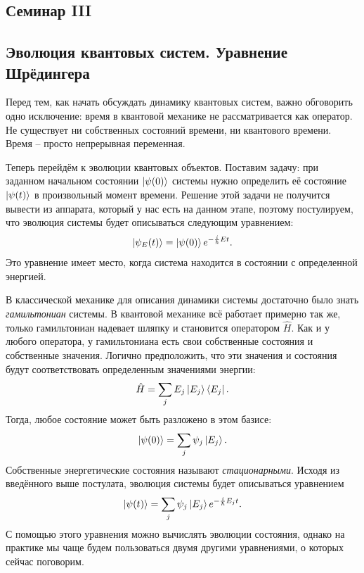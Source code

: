 \begin{center}
    \section{Семинар III}
\end{center}
\subsection{Эволюция квантовых систем. Уравнение Шрёдингера}
\hspace{1em} Перед тем, как начать обсуждать динамику квантовых систем, важно обговорить одно исключение: время в квантовой механике не рассматривается как оператор. Не существует ни собственных состояний времени, ни квантового времени. Время – просто непрерывная переменная.

Теперь перейдём к эволюции квантовых объектов. Поставим задачу: при заданном начальном состоянии $\ket{\psi(0)}$ системы нужно определить её состояние $\ket{\psi(t)}$ в произвольный момент времени. Решение этой задачи не получится вывести из аппарата, который у нас есть на данном этапе, поэтому постулируем, что эволюция системы будет описываться следующим уравнением:
\[
\ket{\psi_E(t)} = \ket{\psi(0)} e^{-\frac{i}{\hbar} E t}.
\]
Это уравнение имеет место, когда система находится в состоянии с определенной энергией.

В классической механике для описания динамики системы достаточно было знать \textit{гамильтониан} системы. В квантовой механике всё работает примерно так же, только гамильтониан надевает шляпку и становится оператором $\hat{H}$. Как и у любого оператора, у гамильтониана есть свои собственные состояния и собственные значения. Логично предположить, что эти значения и состояния будут соответствовать определенным значениями энергии:
\[
\hat{H} = \sum_j E_j \ket{E_j} \bra{E_j}.
\]
Тогда, любое состояние может быть разложено в этом базисе:
\[
\ket{\psi(0)} = \sum_j \psi_j \ket{E_j}.
\]
Собственные энергетические состояния называют \textit{стационарными}. Исходя из введённого выше постулата, эволюция системы будет описываться уравнением
\[
\ket{\psi(t)} = \sum_j \psi_j \ket{E_j} e^{-\frac{i}{\hbar} E_j t}.
\]
С помощью этого уравнения можно вычислять эволюции состояния, однако на практике мы чаще будем пользоваться двумя другими уравнениями, о которых сейчас поговорим.

